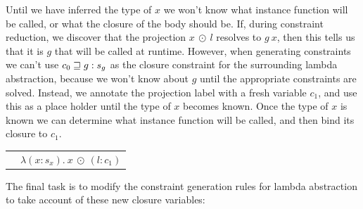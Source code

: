 \medskip
Until we have inferred the type of $x$ we won't know what instance function will be called, or what the closure of the body should be. If, during constraint reduction, we discover that the projection $x \ \odot \ l$ resolves to $g \ x$, then this tells us that it is $g$ that will be called at runtime. However, when generating constraints we can't use $c_0 \sqsupseteq g : s_g$ as the closure constraint for the surrounding lambda abstraction, because we won't know about $g$ until the appropriate constraints are solved. Instead, we annotate the projection label with a fresh variable $c_1$, and use this as a place holder until the type of $x$ becomes known. Once the type of $x$ is known we can determine what instance function will be called, and then bind its closure to $c_1$.

\qq\qq
\begin{tabular}{ll}
	& $\lambda (x : s_x). \ x \ \odot \ (l : c_1)$ \\
\end{tabular}

The final task is to modify the constraint generation rules for lambda abstraction to take account of these new closure variables:

